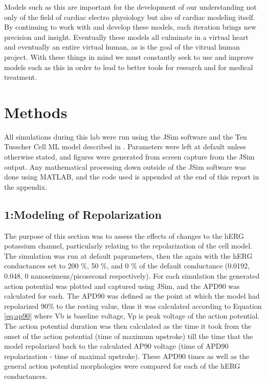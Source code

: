 \documentclass[11pt]{article}
\begin{document}
\par{}
Models such as this are important for the development of our understanding not only of the field of cardiac electro physiology but also of cardiac modeling itself. By continuing to work with and develop these models, each iteration brings new precision and insight. Eventually these models all culminate in a virtual heart and eventually an entire virtual human, as is the goal of the vitrual human project.\cite{Fink2011} With these things in mind we must constantly seek to use and improve models such as this in order to lead to better tools for research and for medical treatment.

\section{Methods}
\par{}
All simulations during this lab were run using the JSim software and the Ten Tusscher Cell ML model described in \cite{TenTusscher2003}. Parameters were left at default unless otherwise stated, and figures were generated from screen capture from the JSim output. Any mathematical processing down outside of the JSim software was done using MATLAB, and the code used is appended at the end of this report in the appendix.

\subsection{1:Modeling of Repolarization}
The purpose of this section was to assess the effects of changes to the hERG potassium channel, particularly relating to the repolarization of the cell model. The simulation was run at default paprameters, then the again with the hERG conductances set to 200 \%, 50 \%, and 0 \% of the default conductance (0.0192, 0.048, 0 nanoseimens/picosecond
respectively). For each simulation the generated action potential was plotted  and captured using JSim, and the APD90 was calculated for each. The APD90 was defined as the point at which the model had repolarized 90\% to the resting value, thus it was calculated according to Equation \ref{eq:ap90} where Vb is baseline voltage, Vp is peak voltage of the action potential. The action potential duration was then calculated as the time it took from the onset of the action potential (time of maximum upstroke) till the time that the model repolarized back to the calculated AP90 voltage (time of APD90 repolarization - time of maximal upstroke). These APD90 times as well as the general action potential morphologies were compared for each of the hERG conductances.
\end{document}
